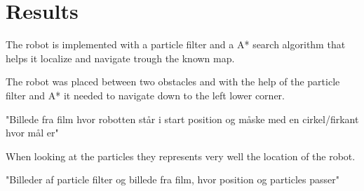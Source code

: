 \chapter{Results}
\label{chp:resul}

The robot is implemented with a particle filter and a A* search algorithm that helps it localize and navigate trough the known map. 


The robot was placed between two obstacles and with the help of the particle filter and A* it needed to navigate down to the left lower corner. 

"Billede fra film hvor robotten står i start position og måske med en cirkel/firkant hvor mål er"

When looking at the particles they represents very well the location of the robot. 

"Billeder af particle filter og billede fra film, hvor position og particles passer"



 